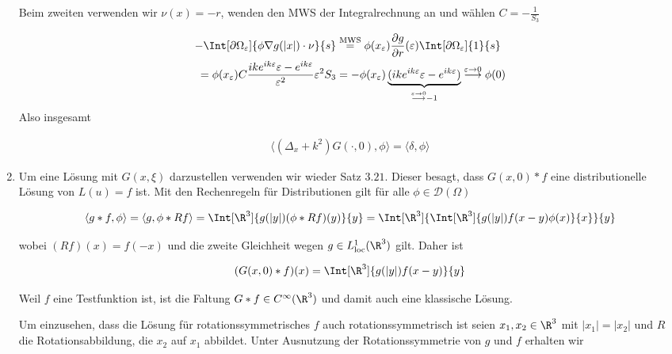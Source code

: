 \begin{solution}
\begin{enumerate}[label = (\roman*)]
Beim zweiten verwenden wir $\nu(x) = - r$, wenden den MWS der Integralrechnung an und wählen $C = -\frac{1}{S_3}$

\begin{align*}
  - \Int[\partial \Omega_\varepsilon]{\phi \nabla g(|x|) \cdot \nu}{s}
  &\stackrel{\text{MWS}}{=}
  \phi(x_\varepsilon) \frac{\partial g}{\partial r}(\varepsilon) \Int[\partial \Omega_\varepsilon]{1}{s} \\
  =
  \phi(x_\varepsilon) C \frac{ik e^{ik\varepsilon}\varepsilon - e^{ik\varepsilon}}{\varepsilon^2} \varepsilon^2 S_3
  &=
  -\phi(x_\varepsilon) \underbrace{(ik e^{ik\varepsilon}\varepsilon - e^{ik\varepsilon})}_{\stackrel{\varepsilon \to 0}{\longrightarrow} -1}
  \stackrel{\varepsilon \to 0}{\longrightarrow}
  \phi(0)
\end{align*}
Also insgesamt

\begin{align*}
  \langle (\Delta_x + k^2)G(\cdot, 0), \phi \rangle
  =
  \langle \delta, \phi \rangle
\end{align*}

\item Um eine Lösung mit $G(x,\xi)$ darzustellen verwenden wir wieder Satz $3.21$. Dieser besagt, dass
$G(x,0) \ast f$ eine distributionelle Lösung von $L(u) = f$ ist. Mit den Rechenregeln für Distributionen gilt für alle $\phi \in \mathcal{D}(\Omega)$

\begin{align*}
  \langle g \ast f, \phi \rangle
  =
  \langle g, \phi \ast Rf \rangle
  =
  \Int[\R^3]{g(|y|)(\phi \ast Rf)(y)}{y}
  =
  \Int[\R^3]{
    \Int[\R^3]{g(|y|) f(x-y) \phi(x)}{x}
    }{y}
\end{align*}

wobei $(Rf)(x) = f(-x)$ und die zweite Gleichheit wegen $g \in L^1_{\mathrm{loc}}(\R^3)$ gilt. Daher ist

\begin{align*}
  (G(x,0) \ast f)(x)
  =
  \Int[\R^3]{g(|y|) f(x-y)}{y}
\end{align*}

Weil $f$ eine Testfunktion ist, ist die Faltung $G \ast f \in C^{\infty}(\R^3)$ und damit auch eine klassische Lösung.

Um einzusehen, dass die Lösung für rotationssymmetrisches $f$ auch rotationssymmetrisch ist seien $x_1, x_2 \in \R^3$ mit
$|x_1| = |x_2|$ und $R$ die Rotationsabbildung, die $x_2$ auf $x_1$ abbildet.
Unter Ausnutzung der Rotationssymmetrie von $g$ und $f$ erhalten wir


\end{enumerate}
\end{solution}

